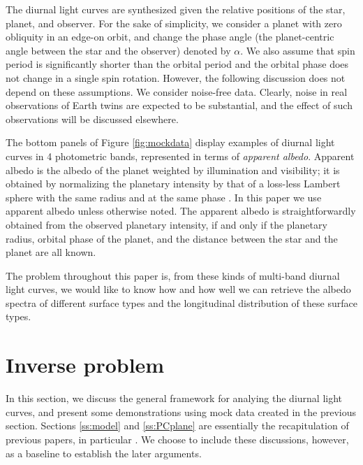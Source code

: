 \documentclass[iop,numberedappendix,apj]{emulateapj}
\def\memoJLY#1{\color{green}[JLY: {\bf #1}]\color{black}}
\begin{document}

The diurnal light curves are synthesized given the relative positions of the star, planet, and observer. 
For the sake of simplicity, we consider a planet with zero obliquity in an edge-on orbit, and change the phase angle (the planet-centric angle between the star and the observer) denoted by $\alpha $. 
We also assume that spin period is significantly shorter than the orbital period and the orbital phase does not change in a single spin rotation. 
However, the following discussion does not depend on these assumptions. 
We consider noise-free data. Clearly, noise in real observations of Earth twins are expected to be substantial, and the effect of such observations will be discussed elsewhere. 

The bottom panels of Figure \ref{fig:mockdata} display examples of diurnal light curves in 4 photometric bands, represented in terms of {\it apparent albedo}. 
Apparent albedo is the albedo of the planet weighted by illumination and visibility; it is obtained by normalizing the planetary intensity by that of a loss-less Lambert sphere with the same radius and at the same phase \citep{Qiu2003, Seager2010}. 
In this paper we use apparent albedo unless otherwise noted. 
The apparent albedo is straightforwardly obtained from the observed planetary intensity, if and only if the planetary radius, orbital phase of the planet, and the distance between the star and the planet are all known. 

The problem throughout this paper is, from these kinds of multi-band diurnal light curves, we would like to know how and how well we can retrieve the albedo spectra of different surface types and the longitudinal distribution of these surface types. 


\section{Inverse problem}
\label{s:frame}

In this section, we discuss the general framework for analying the diurnal light curves, and present some demonstrations using mock data created in the previous section. 
Sections \ref{ss:model} and \ref{ss:PCplane} are essentially the recapitulation of previous papers, in particular \citet{Cowan2013} \citep[but see also][]{Cowan2009,Cowan2011,Fujii2010,Fujii2011}.  
We choose to include these discussions, however, as a baseline to establish the later arguments. 
\end{document}
